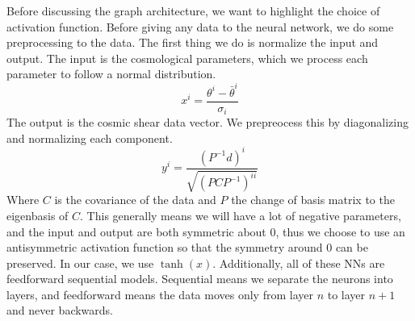 Before discussing the graph architecture, we want to highlight the choice of activation function. Before giving any data to the neural network, we do some preprocessing to the data. The first thing we do is normalize the input and output. The input is the cosmological parameters, which we process each parameter to follow a normal distribution.
\begin{equation}
	x^i = \frac{\theta^i - \bar\theta^i}{\sigma_i}
\end{equation}
The output is the cosmic shear data vector. We prepreocess this by diagonalizing and normalizing each component.
\begin{equation}
	y^i = \frac{ (P^{-1}d)^i }{\sqrt{(PCP^{-1})^{ii}}}
\end{equation}
Where $C$ is the covariance of the data and $P$ the change of basis matrix to the eigenbasis of $C$. This generally means we will have a lot of negative parameters, and the input and output are both symmetric about 0, thus we choose to use an antisymmetric activation function so that the symmetry around 0 can be preserved. In our case, we use $\tanh(x)$. Additionally, all of these NNs are feedforward sequential models. Sequential means we separate the neurons into layers, and feedforward means the data moves only from layer $n$ to layer $n+1$ and never backwards.
